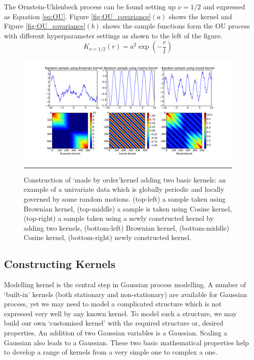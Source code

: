 The Ornstein-Uhlenbeck process can be found setting up $\nu=1/2$ and expressed as Equation \ref{eq:OU}. Figure \ref{fig:OU_covariance}$(a)$ shows the kernel and Figure \ref{fig:OU_covariance}$(b)$ shows the sample functions form the OU process  with different hyperparameter settings as shown to the left of the figure.  
\begin{equation} \label{eq:OU}
K_{\nu=1/2}(r)= a^2 \exp \left(-\frac{r}{l} \right)
\end{equation}


\begin{figure}[!htbp]
	\centering
	\includegraphics[width=\textwidth,keepaspectratio]{diagrams/ConstructKernels_BR_Cos.pdf}
	\rule{45em}{0.5pt}
	\caption[Construction of a new kernel adding two basic kernels]
	{Construction of \lq made by order\rq kernel adding two basic kernels: an example of a univariate data which is globally periodic and locally governed by some random motions. (top-left) a sample taken using Brownian kernel, (top-middle) a sample is taken using Cosine kernel, (top-right) a sample taken using a newly constructed kernel by adding two kernels, (bottom-left) Brownian kernel, (bottom-middle) Cosine kernel, (bottom-right) newly constructed kernel.} 
	\label{fig:ConstructKernels_BR_Cos}
\end{figure}

\subsection{Constructing Kernels}

Modelling kernel is the central step in Gaussian process modelling. A number of \lq built-in\rq{ }kernels (both stationary and non-stationary) are available for Gaussian process, yet we may need to model a complicated structure which is not expressed very well by any known kernel. To model such a structure, we may build our own \lq customised kernel\rq{ }with the required structure or, desired properties. An addition of two Gaussian variables is a Gaussian. Scaling a Gaussian also leads to a Gaussian. These two basic mathematical properties help to develop a range of kernels from a very simple one to complex a one. 


